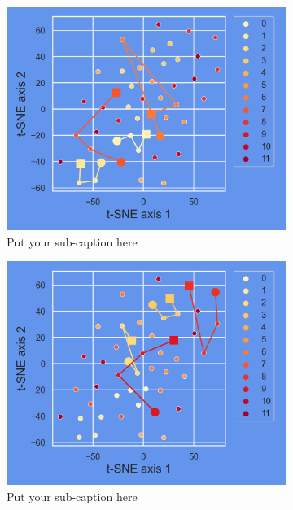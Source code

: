 \begin{figure}[ht]
	\centering
	\begin{subfigure}{.45\textwidth}
		\centering
		\includegraphics[width=.9\linewidth]{./figs/preds_tSNE_0.png}  
		\caption{Put your sub-caption here}
		\label{fig:sub-first}
	\end{subfigure}
	\begin{subfigure}{.45\textwidth}
		\centering
		\includegraphics[width=.9\linewidth]{./figs/preds_tSNE_1.png}  
		\caption{Put your sub-caption here}
		\label{fig:sub-second}
	\end{subfigure}	
	\begin{subfigure}{.45\textwidth}
		\centering

\end{subfigure}
\end{figure}

